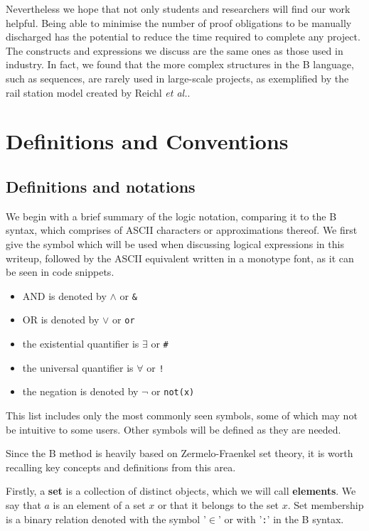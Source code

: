 \documentclass[12pt,journal,duplex]{IEEEtran}
\begin{document}
	Nevertheless we hope that not only students and researchers will find our work helpful. Being able to minimise the number of proof obligations to be manually discharged has the potential to reduce the time required to complete any project. The constructs and expressions we discuss are the same ones as those used in industry. In fact, we found that the more complex structures in the B language, such as sequences, are rarely used in large-scale projects, as exemplified by the rail station model created by Reichl \textit{et al.}\cite{station model}.
	\section{Definitions and Conventions}

	\subsection{Definitions and notations}
	We begin with a brief summary of the logic notation, comparing it to the B syntax, which comprises of ASCII characters or approximations thereof. We first give the symbol which will be used when discussing logical expressions in this writeup, followed by the ASCII equivalent written in a monotype font, as it can be seen in code snippets.
	\begin{itemize}
		\item AND is denoted by $\wedge$ or \texttt{\&}
		\item OR is denoted by $\vee$ or \texttt{or}
		\item the existential quantifier is $\exists$ or \texttt{\#}
		\item the universal quantifier is $\forall$ or \texttt{!}
		\item the negation is denoted by $\neg$ or \texttt{not(x)}
	\end{itemize}
	This list includes only the most commonly seen symbols, some of which may not be intuitive to some users. Other symbols will be defined as they are needed.

	Since the B method is heavily based on Zermelo-Fraenkel set theory, it is worth recalling key concepts and definitions from this area.\cite{Goldrei}

	Firstly, a \textbf{set} is a collection of distinct objects, which we will call \textbf{elements}. We say that $a$ is an element of a set $x$ or that it belongs to the set $x$. Set membership is a binary relation denoted with the symbol '$\in$' or with '\texttt{:}' in the B syntax.
\end{document}
